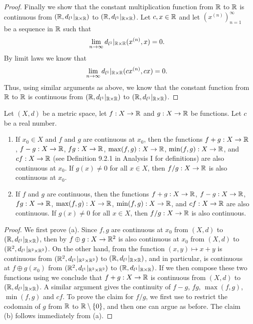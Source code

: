 \begin{proof}
  Finally we show that the constant multiplication function from \(\mathbb{R}\) to \(\mathbb{R}\) is continuous from \((\mathbb{R}, d_{l^1}|_{\mathbb{R} \times \mathbb{R}})\) to \((\mathbb{R}, d_{l^1}|_{\mathbb{R} \times \mathbb{R}})\).
  Let \(c, x \in \mathbb{R}\) and let \((x^{(n)})_{n = 1}^\infty\) be a sequence in \(\mathbb{R}\) such that
  \[
    \lim_{n \to \infty} d_{l^1}|_{\mathbb{R} \times \mathbb{R}}(x^{(n)}, x) = 0.
  \]
  By limit laws we know that
  \[
    \lim_{n \to \infty} d_{l^1}|_{\mathbb{R} \times \mathbb{R}}(cx^{(n)}, cx) = 0.
  \]
  Thus, using similar arguments as above, we know that the constant function from \(\mathbb{R}\) to \(\mathbb{R}\) is continuous from \((\mathbb{R}, d_{l^1}|_{\mathbb{R} \times \mathbb{R}})\) to \((\mathbb{R}, d_{l^1}|_{\mathbb{R} \times \mathbb{R}})\).
\end{proof}

\begin{cor}\label{ii:2.2.3}
  Let \((X, d)\) be a metric space, let \(f : X \to \mathbb{R}\) and \(g : X \to \mathbb{R}\) be functions.
  Let \(c\) be a real number.
  \begin{enumerate}
    \item\label{ii:2.2.3.a} If \(x_0 \in X\) and \(f\) and \(g\) are continuous at \(x_0\), then the functions \(f + g : X \to \mathbb{R}\), \(f - g : X \to \mathbb{R}\), \(fg : X \to \mathbb{R}\), \(\max(f, g) : X \to \mathbb{R}\), \(\min(f, g) : X \to \mathbb{R}\), and \(cf : X \to \mathbb{R}\) (see Definition 9.2.1 in Analysis I for definitions) are also continuous at \(x_0\).
    If \(g(x) \neq 0\) for all \(x \in X\), then \(f / g : X \to \mathbb{R}\) is also continuous at \(x_0\).
    \item\label{ii:2.2.3.b} If \(f\) and \(g\) are continuous, then the functions \(f + g : X \to \mathbb{R}\), \(f - g : X \to \mathbb{R}\), \(fg : X \to \mathbb{R}\), \(\max(f, g) : X \to \mathbb{R}\), \(\min(f, g) : X \to \mathbb{R}\), and \(cf : X \to \mathbb{R}\) are also continuous.
    If \(g(x) \neq 0\) for all \(x \in X\), then \(f / g : X \to \mathbb{R}\) is also continuous.
  \end{enumerate}
\end{cor}

\begin{proof}
  We first prove (a). Since \(f, g\) are continuous at \(x_0\) from \((X, d)\) to \((\mathbb{R}, d_{l^1}|_{\mathbb{R} \times \mathbb{R}})\), then by  \(f \oplus g : X \to \mathbb{R}^2\) is also continuous at \(x_0\) from \((X, d)\) to \((\mathbb{R}^2, d_{l^1}|_{\mathbb{R}^2 \times \mathbb{R}^2})\).
  On the other hand, from  the function \((x, y) \mapsto x + y\) is continuous from \((\mathbb{R}^2, d_{l^1}|_{\mathbb{R}^2 \times \mathbb{R}^2})\) to \((\mathbb{R}, d_{l^1}|_{\mathbb{R} \times \mathbb{R}})\), and in particular, is continuous at \(f \oplus g(x_0)\) from \((\mathbb{R}^2, d_{l^1}|_{\mathbb{R}^2 \times \mathbb{R}^2})\) to \((\mathbb{R}, d_{l^1}|_{\mathbb{R} \times \mathbb{R}})\).
  If we then compose these two functions using  we conclude that \(f + g : X \to \mathbb{R}\) is continuous from \((X, d)\) to \((\mathbb{R}, d_{l^1}|_{\mathbb{R} \times \mathbb{R}})\).
  A similar argument gives the continuity of \(f - g\), \(fg\), \(\max(f, g)\), \(\min(f, g)\) and \(cf\).
  To prove the claim for \(f / g\), we first use  to restrict the codomain of \(g\) from \(\mathbb{R}\) to \(\mathbb{R} \setminus \left\lbrace0\right\rbrace\), and then one can argue as before.
  The claim (b) follows immediately from (a).
\end{proof}

